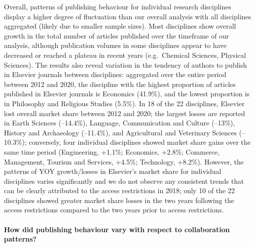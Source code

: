 \documentclass[
]{article}
\begin{document}
Overall, patterns of publishing behaviour for individual research disciplines display a higher degree of fluctuation than our overall analysis with all disciplines aggregated (likely due to smaller sample sizes). Most disciplines show overall growth in the total number of articles published over the timeframe of our analysis, although publication volumes in some disciplines appear to have decreased or reached a plateau in recent years (e.g.~Chemical Sciences, Physical Sciences). The results also reveal variation in the tendency of authors to publish in Elsevier journals between disciplines: aggregated over the entire period between 2012 and 2020, the discipline with the highest proportion of articles published in Elsevier journals is Economics (41.9\%), and the lowest proportion is in Philosophy and Religious Studies (5.5\%). In 18 of the 22 disciplines, Elsevier lost overall market share between 2012 and 2020; the largest losses are reported in Earth Sciences (--14.4\%), Language, Communication and Culture (--13\%), History and Archaeology (--11.4\%), and Agricultural and Veterinary Sciences (--10.3\%); conversely, four individual disciplines showed market share gains over the same time period (Engineering, +1.1\%; Economics, +2.8\%; Commerce, Management, Tourism and Services, +4.5\%; Technology, +8.2\%). However, the patterns of YOY growth/losses in Elsevier's market share for individual disciplines varies significantly and we do not observe any consistent trends that can be clearly attributed to the access restrictions in 2018; only 10 of the 22 disciplines showed greater market share losses in the two years following the access restrictions compared to the two years prior to access restrictions.

\hypertarget{how-did-publishing-behaviour-vary-with-respect-to-collaboration-patterns}{%
\paragraph{How did publishing behaviour vary with respect to collaboration patterns?}\label{how-did-publishing-behaviour-vary-with-respect-to-collaboration-patterns}}
\end{document}
